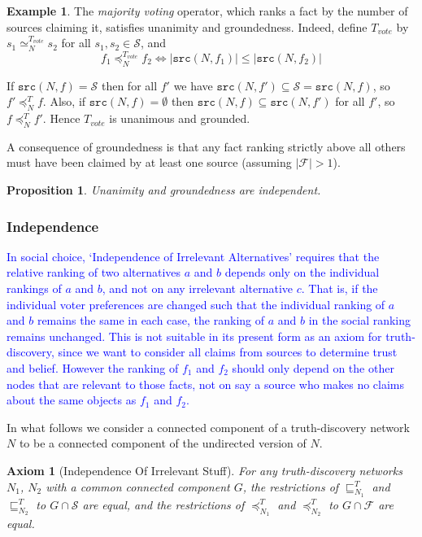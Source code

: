 \documentclass{article}
\theoremstyle{definition} \newtheorem{definition}{Definition}
\theoremstyle{definition} \newtheorem{example}{Example}
\theoremstyle{plain} \newtheorem{axiom}{Axiom}
\theoremstyle{plain} \newtheorem*{remark}{Remark}
\theoremstyle{remark} \newtheorem*{notation}{Notation}
\theoremstyle{plain} \newtheorem{lemma}{Lemma}
\theoremstyle{plain} \newtheorem{theorem}{Theorem}
\theoremstyle{plain} \newtheorem{proposition}{Proposition}
\newcommand{\rough}[1] {
    \textcolor{blue}{
        #1
    }
}
\renewcommand{\S}{\mathcal{S}}  %
\newcommand{\F}{\mathcal{F}}
\newcommand{\sle}{\sqsubseteq}
\newcommand{\seq}{\simeq}
\newcommand{\fle}{\preceq}
\newcommand{\src}{\texttt{src}}
\begin{document}
\begin{example}
The \emph{majority voting} operator, which ranks a fact by the number of
sources claiming it, satisfies unanimity and groundedness. Indeed, define
$T_{vote}$ by $s_1 \seq_N^{T_{vote}} s_2$ for all $s_1, s_2 \in \S$, and
    $$ f_1 \fle_N^{T_{vote}} f_2 \iff |\src(N, f_1)| \le |\src(N, f_2)| $$

If $\src(N, f) = \S$ then for all $f'$ we have $\src(N, f') \subseteq \S =
\src(N, f)$, so $f' \fle_N^T f$. Also, if $\src(N, f) = \emptyset$ then
$\src(N, f) \subseteq \src(N, f')$ for all $f'$, so $f \fle_N^T f'$. Hence
$T_{vote}$ is unanimous and grounded.
\end{example}

A consequence of groundedness is that any fact ranking strictly above all
others must have been claimed by at least one source (assuming $|\F|>1$).

\begin{proposition}
\label{prop:unam_ground_indep}
Unanimity and groundedness are independent.
\end{proposition}

\subsubsection{Independence}

\rough{
    In social choice, `Independence of Irrelevant Alternatives' requires that
    the relative ranking of two alternatives $a$ and $b$ depends only on the
    individual rankings of $a$ and $b$, and not on any irrelevant alternative
    $c$. That is, if the individual voter preferences are changed such that the
    individual ranking of $a$ and $b$ remains the same in each case, the
    ranking of $a$ and $b$ in the social ranking remains unchanged.
    This is not suitable in its present form as an axiom for truth-discovery,
    since we want to consider all claims from sources to determine trust and
    belief. However the ranking of $f_1$ and $f_2$ should only depend on the
    other nodes that are relevant to those facts, not on say a source who makes
    no claims about the same objects as $f_1$ and $f_2$.
}

In what follows we consider a connected component of a truth-discovery network
$N$ to be a connected component of the undirected version of $N$.

\begin{axiom}[Independence Of Irrelevant Stuff]
\label{axiom:indep}
For any truth-discovery networks $N_1$, $N_2$ with a common connected component
$G$, the restrictions of $\sle_{N_1}^T$ and $\sle_{N_2}^T$ to $G \cap \S$ are
equal, and the restrictions of $\fle_{N_1}^T$ and $\fle_{N_2}^T$ to $G \cap \F$
are equal.
\end{axiom}
\end{document}
